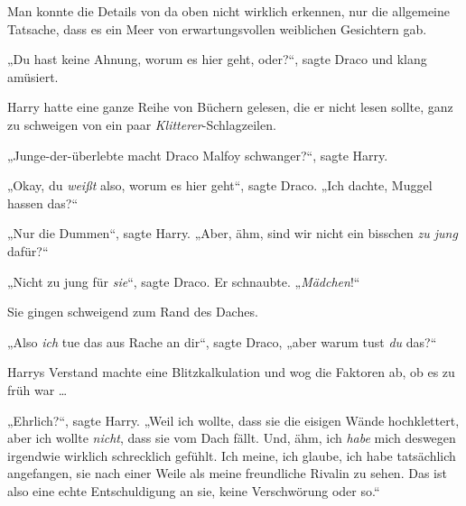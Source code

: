\later

Man konnte die Details von da oben nicht wirklich erkennen, nur die allgemeine Tatsache, dass es ein Meer von erwartungsvollen weiblichen Gesichtern gab.

„Du hast keine Ahnung, worum es hier geht, oder?“, sagte Draco und klang amüsiert.

Harry hatte eine ganze Reihe von Büchern gelesen, die er nicht lesen sollte, ganz zu schweigen von ein paar \emph{Klitterer}-Schlagzeilen.

„Junge-der-überlebte macht Draco Malfoy schwanger?“, sagte Harry.

„Okay, du \emph{weißt} also, worum es hier geht“, sagte Draco.
„Ich dachte, Muggel hassen das?“

„Nur die Dummen“, sagte Harry.
„Aber, ähm, sind wir nicht ein bisschen \emph{zu jung} dafür?“

„Nicht zu jung für \emph{sie}“, sagte Draco. Er schnaubte.
„\emph{Mädchen}!“

Sie gingen schweigend zum Rand des Daches.

„Also \emph{ich} tue das aus Rache an dir“, sagte Draco, „aber warum tust \emph{du} das?“

Harrys Verstand machte eine Blitzkalkulation und wog die Faktoren ab, ob es zu früh war …

„Ehrlich?“, sagte Harry.
„Weil ich wollte, dass sie die eisigen Wände hochklettert, aber ich wollte \emph{nicht}, dass sie vom Dach fällt. Und, ähm, ich \emph{habe} mich deswegen irgendwie wirklich schrecklich gefühlt. Ich meine, ich glaube, ich habe tatsächlich angefangen, sie nach einer Weile als meine freundliche Rivalin zu sehen. Das ist also eine echte Entschuldigung an sie, keine Verschwörung oder so.“

